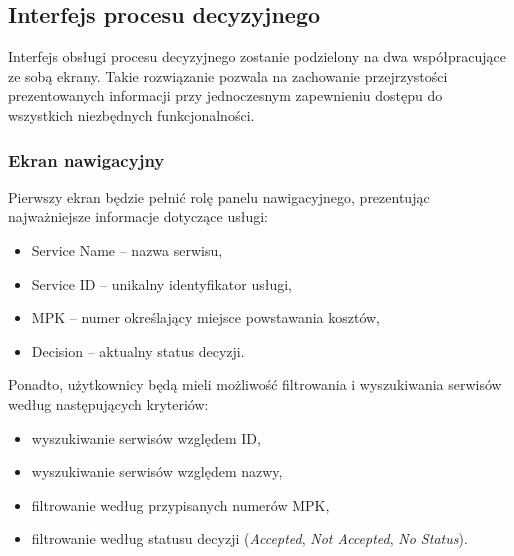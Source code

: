 \subsection{Interfejs procesu decyzyjnego}
Interfejs obsługi procesu decyzyjnego zostanie podzielony na dwa współpracujące ze sobą ekrany. Takie rozwiązanie pozwala na zachowanie przejrzystości prezentowanych informacji przy jednoczesnym zapewnieniu dostępu do wszystkich niezbędnych funkcjonalności.

\subsubsection*{Ekran nawigacyjny}
Pierwszy ekran będzie pełnić rolę panelu nawigacyjnego, prezentując najważniejsze informacje dotyczące usługi:
\begin{itemize}
    \item Service Name -- nazwa serwisu,
    \item Service ID -- unikalny identyfikator usługi,
    \item MPK -- numer określający miejsce powstawania kosztów,
    \item Decision -- aktualny status decyzji.
\end{itemize}
Ponadto, użytkownicy będą mieli możliwość filtrowania i wyszukiwania serwisów według następujących kryteriów:
\begin{itemize}
    \item wyszukiwanie serwisów względem ID,
    \item wyszukiwanie serwisów względem nazwy,
    \item filtrowanie według przypisanych numerów MPK,
    \item filtrowanie według statusu decyzji (\emph{Accepted}, \emph{Not Accepted}, \emph{No Status}).
\end{itemize}

